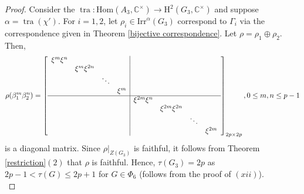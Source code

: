 \documentclass[a4paper,11pt]{amsart}
\numberwithin{equation}{section}
\numberwithin{equation}{subsection}
\newcommand{\C}{\mathbb{C}}
\newcommand{\Hom}{\mathrm{Hom}}
\newcommand{\tra}{\operatorname{tra}}
\begin{document}
\begin{proof}
Consider the $\tra: \Hom(A_3,\C^\times)\to \mathrm{H}^2(G_3,\C^\times)$ and suppose $\alpha= \operatorname{tra}(\chi')$. For $i=1,2$, let  $\rho_i \in \mathrm{Irr}^\alpha(G_3)$ correspond to $\Gamma_i$ via the correspondence given in Theorem \ref{bijective correspondence}. Let $\rho= \rho_1 \oplus \rho_2$. 
Then, $$\rho(\beta_1^m \beta_2^n)= \left[\begin{array}{cccc|cccc}
	\xi^{m}\xi^{n} & & & & & & &\\
	& \xi^{m}\xi^{2n} & & & & & & \\
	& & \ddots & & & & & \\
	& & & \xi^{m} & & & & \\
	\hline
	& & & & \xi^{2m}\xi^{n} & & & \\
	& & & & & \xi^{2m}\xi^{2n} & &  \\
	& & & & & & \ddots & \\
	& & & & & & & \xi^{2m}  \\
\end{array}\right]_{2p \times 2p}, 0\leq m, n \leq p-1$$
is a diagonal matrix.
Since $\rho|_{Z(G_3)}$ is faithful, it follows from Theorem \ref{restriction}$(2)$ that $\rho$ is faithful. Hence, $\tau(G_3) = 2p$ as $2p-1 < \tau(G) \leq 2p+1$ for $G\in \Phi_6$ (follows from the proof of $(xii)$). \\
\fi  %



\end{proof}
\end{document}
